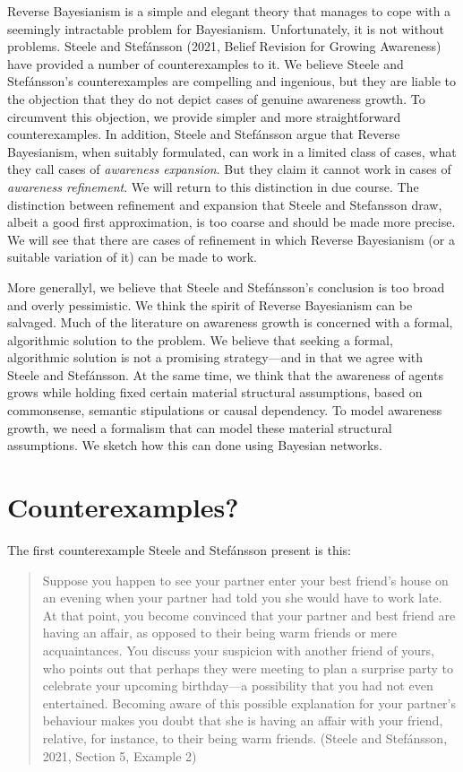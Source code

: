 \documentclass[
  11pt,
  dvipsnames,enabledeprecatedfontcommands]{scrartcl}
\begin{document}
Reverse Bayesianism is a simple and elegant theory that manages to cope
with a seemingly intractable problem for Bayesianism. Unfortunately, it
is not without problems. Steele and Stefánsson (2021, Belief Revision
for Growing Awareness) have provided a number of counterexamples to it.
We believe Steele and Stefánsson's counterexamples are compelling and
ingenious, but they are liable to the objection that they do not depict
cases of genuine awareness growth. To circumvent this objection, we
provide simpler and more straightforward counterexamples. In addition,
Steele and Stefánsson argue that Reverse Bayesianism, when suitably
formulated, can work in a limited class of cases, what they call cases
of \textit{awareness expansion}. But they claim it cannot work in cases
of \textit{awareness refinement}. We will return to this distinction in
due course. The distinction between refinement and expansion that Steele
and Stefansson draw, albeit a good first approximation, is too coarse
and should be made more precise. We will see that there are cases of
refinement in which Reverse Bayesianism (or a suitable variation of it)
can be made to work.

More generallyl, we believe that Steele and Stefánsson's conclusion is
too broad and overly pessimistic. We think the spirit of Reverse
Bayesianism can be salvaged. Much of the literature on awareness growth
is concerned with a formal, algorithmic solution to the problem. We
believe that seeking a formal, algorithmic solution is not a promising
strategy---and in that we agree with Steele and Stefánsson. At the same
time, we think that the awareness of agents grows while holding fixed
certain material structural assumptions, based on commonsense, semantic
stipulations or causal dependency. To model awareness growth, we need a
formalism that can model these material structural assumptions. We
sketch how this can done using Bayesian networks.

\hypertarget{counterexamples}{%
\section{Counterexamples?}\label{counterexamples}}

The first counterexample Steele and Stefánsson present is this:

\begin{quote}
Suppose you happen to see your partner enter your best friend's house on
an evening when your partner had told you she would have to work late.
At that point, you become convinced that your partner and best friend
are having an affair, as opposed to their being warm friends or mere
acquaintances. You discuss your suspicion with another friend of yours,
who points out that perhaps they were meeting to plan a surprise party
to celebrate your upcoming birthday---a possibility that you had not
even entertained. Becoming aware of this possible explanation for your
partner's behaviour makes you doubt that she is having an affair with
your friend, relative, for instance, to their being warm friends.
(Steele and Stefánsson, 2021, Section 5, Example 2)
\end{quote}
\end{document}
